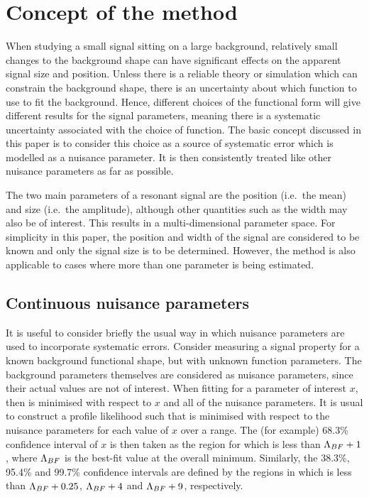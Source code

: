 \section{Concept of the method} %
\label{sec:concept}

When studying a small signal sitting on
a large background, relatively small changes to the background shape can
have significant effects on the apparent signal size and position.
Unless there is a
reliable theory or simulation which can constrain the background shape,
there is an uncertainty about which function to use to fit
the background. Hence, different choices of the functional form 
will give different results for the signal parameters, meaning there is a
systematic uncertainty associated with the choice of function.
The basic concept discussed in this paper is to consider this choice
as a source of systematic error which is modelled as a nuisance parameter.
It is then consistently treated like other nuisance parameters as far as
possible.

The two main parameters of a resonant signal are the position (i.e.~the mean)
and size (i.e.~the amplitude), although other
quantities such as the width may also be of interest. This results in a
multi-dimensional parameter space. For simplicity in this paper, the position
and width of the signal are considered to be known and only the signal
size is to be determined. However, the method is also applicable to
cases where more than one parameter is being estimated.

\subsection{Continuous nuisance parameters}
\label{sec:concept:continuous}

It is useful to consider briefly the usual way in which nuisance
parameters are used to incorporate systematic errors. Consider measuring a signal
property for a known background functional shape, but with unknown function
parameters. The background parameters themselves are considered as
nuisance parameters, since their actual values are not of interest.
When fitting for a parameter of interest $x$, then \nll  
is minimised with respect to $x$ and all of the
nuisance parameters. It is usual to construct a profile likelihood
such that \nll is minimised with respect to the nuisance parameters
for each value of $x$ over a range.
The (for example) 68.3\% confidence interval of $x$
is then
taken as the region for which \nll is less than ${\rm \Lambda}_{BF}+1$,
where ${\rm \Lambda}_{BF}$ is the best-fit value at the overall minimum.
Similarly, the 38.3\%, 95.4\% and 99.7\% confidence intervals are defined by the
regions in which \nll is less than ${\rm \Lambda}_{BF}+0.25$, ${\rm \Lambda}_{BF}+4$
and ${\rm \Lambda}_{BF}+9$, respectively.


